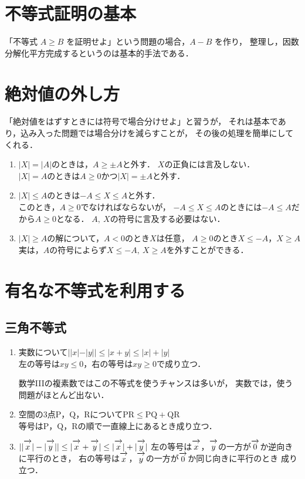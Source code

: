 \documentclass[autodetect-engine,ja=standard, 10.5pt, a4paper, titlepage]{bxjsarticle}
\renewcommand{\v}[1]{\overrightarrow{\mathstrut{#1}}}
\renewcommand{\rm}[1]{\mathrm{#1}}
\numberwithin{equation}{section} %
\begin{document}
\section{不等式証明の基本}\label{sec:basis-ineq}
「不等式 $A\geq B$ を証明せよ」という問題の場合，$A-B$ を作り，
整理し，因数分解化平方完成するというのは基本的手法である．

\section{絶対値の外し方}\label{sec:how-to-getridof-abs}
「絶対値をはずすときには符号で場合分けせよ」と習うが，
それは基本であり，込み入った問題では場合分けを減らすことが，
その後の処理を簡単にしてくれる．

\begin{enumerate}[1.]
  \item 
  $|X| = |A|$のときは，$A\geq \pm A$と外す．
  $X$の正負には言及しない．\\
  $|X| = A$のときは$A\geq 0$かつ$|X| = \pm A$と外す．\\
  \item 
  $|X|\leq A$のときは$-A\leq X\leq A$と外す．\\
  このとき，$A\geq 0$でなければならないが，
  $-A\leq X\leq A$のときには$-A\leq A$だから$A\geq 0$となる．
  $A,\:X$の符号に言及する必要はない．\\
  \item 
  $|X|\geq A$の解について，$A<0$のとき$X$は任意，
  $A\geq 0$のとき$X\leq -A$，$X\geq A$\\
  実は，$A$の符号によらず$X\leq -A,\:X\geq A$を外すことができる．
\end{enumerate}

\section{有名な不等式を利用する}\label{sec:use-famous-ineqs}
\subsection{三角不等式}

\begin{enumerate}[1.]
  \item 
  実数について$||x|-|y||\leq |x+y|\leq |x|+|y|$\\
  左の等号は$xy\leq 0$，右の等号は$xy\geq 0$で成り立つ．

  数学IIIの複素数ではこの不等式を使うチャンスは多いが，
  実数では，使う問題がほとんど出ない．\\
  \item 
  空間の3点$\rm{P}$，$\rm{Q}$，$\rm{R}$について$\rm{PR}\leq \rm{PQ} + \rm{QR}$\\
  等号は$\rm{P}$，$\rm{Q}$，$\rm{R}$の順で一直線上にあるとき成り立つ．\\
  \item 
  $||\v{x}|-|\v{y}|| \leq |\v{x} + \v{y}| \leq |\v{x}| + |\v{y}|$
  \baselineskip
  左の等号は$\v{x}$，$\v{y}$の一方が$\v{0}$か逆向きに平行のとき，
  右の等号は$\v{x}$，$\v{y}$の一方が$\v{0}$か同じ向きに平行のとき
  成り立つ．
\end{enumerate}
\end{document}
